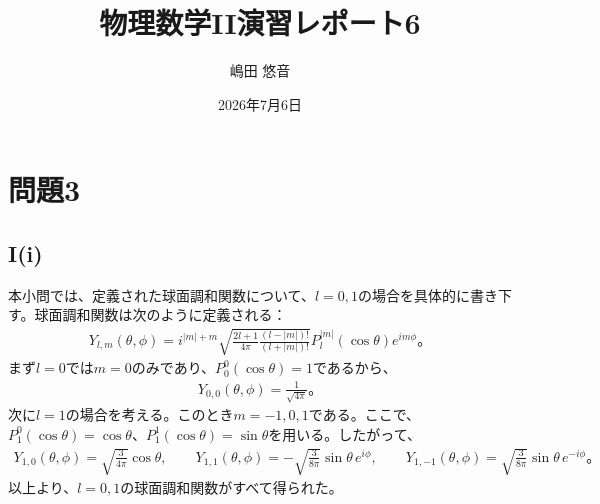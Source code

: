 \newcommand{\ssum}[3]{\sum_{#1=#2}^#3}

\title{物理数学II演習レポート6}
\author{嶋田 悠音}
\date{2026年7月6日}


  \maketitle
  
  \section*{問題3}
  
  \subsection*{I(i)}
  本小問では、定義された球面調和関数について、$l=0,1$の場合を具体的に書き下す。球面調和関数は次のように定義される：
  \begin{align*}
    Y_{l,m}(\theta,\phi)=i^{|m|+m}\sqrt{\frac{2l+1}{4\pi}\frac{(l-|m|)!}{(l+|m|)!}}P_l^{|m|}(\cos\theta)e^{im\phi}。
  \end{align*}
  まず$l=0$では$m=0$のみであり、$P_0^0(\cos\theta)=1$であるから、
  \begin{align*}
    Y_{0,0}(\theta,\phi)=\frac{1}{\sqrt{4\pi}}。
  \end{align*}
  次に$l=1$の場合を考える。このとき$m=-1,0,1$である。ここで、$P_1^0(\cos\theta)=\cos\theta$、$P_1^1(\cos\theta)=\sin\theta$を用いる。したがって、
  \begin{align*}
    Y_{1,0}(\theta,\phi)=\sqrt{\frac{3}{4\pi}}\cos\theta,
    \qquad
    Y_{1,1}(\theta,\phi)=-\sqrt{\frac{3}{8\pi}}\sin\theta\,e^{i\phi},
    \qquad
    Y_{1,-1}(\theta,\phi)=\sqrt{\frac{3}{8\pi}}\sin\theta\,e^{-i\phi}。
  \end{align*}
  以上より、$l=0,1$の球面調和関数がすべて得られた。
  
